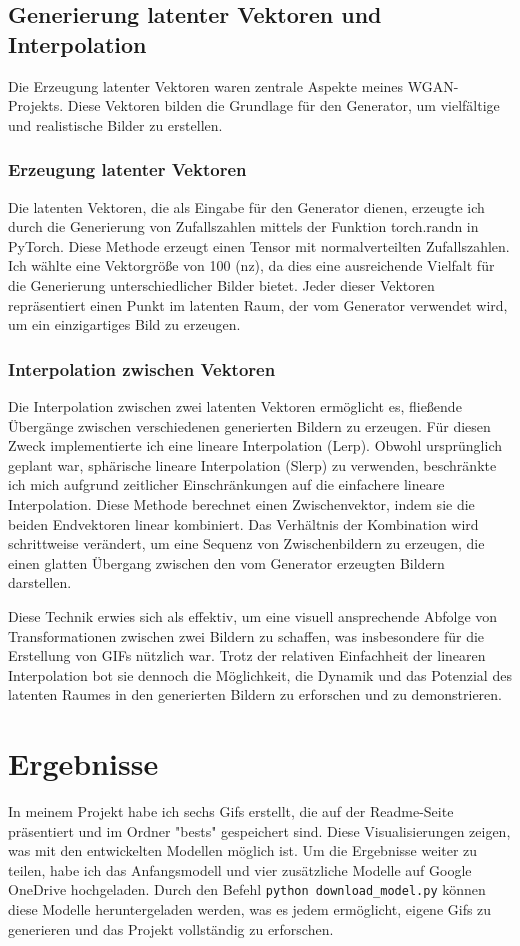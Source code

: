 \documentclass[a4paper, 12pt]{article}
\begin{document}
\subsection{Generierung latenter Vektoren und Interpolation}
Die Erzeugung latenter Vektoren waren zentrale Aspekte meines WGAN-Projekts. Diese Vektoren bilden die Grundlage für den Generator, um vielfältige und realistische Bilder zu erstellen.

\subsubsection{Erzeugung latenter Vektoren}
Die latenten Vektoren, die als Eingabe für den Generator dienen, erzeugte ich durch die Generierung von Zufallszahlen mittels der Funktion torch.randn in PyTorch. Diese Methode erzeugt einen Tensor mit normalverteilten Zufallszahlen. Ich wählte eine Vektorgröße von 100 (nz), da dies eine ausreichende Vielfalt für die Generierung unterschiedlicher Bilder bietet. Jeder dieser Vektoren repräsentiert einen Punkt im latenten Raum, der vom Generator verwendet wird, um ein einzigartiges Bild zu erzeugen.

\subsubsection{Interpolation zwischen Vektoren}
Die Interpolation zwischen zwei latenten Vektoren ermöglicht es, fließende Übergänge zwischen verschiedenen generierten Bildern zu erzeugen. Für diesen Zweck implementierte ich eine lineare Interpolation (Lerp). Obwohl ursprünglich geplant war, sphärische lineare Interpolation (Slerp) zu verwenden, beschränkte ich mich aufgrund zeitlicher Einschränkungen auf die einfachere lineare Interpolation. Diese Methode berechnet einen Zwischenvektor, indem sie die beiden Endvektoren linear kombiniert. Das Verhältnis der Kombination wird schrittweise verändert, um eine Sequenz von Zwischenbildern zu erzeugen, die einen glatten Übergang zwischen den vom Generator erzeugten Bildern darstellen.

Diese Technik erwies sich als effektiv, um eine visuell ansprechende Abfolge von Transformationen zwischen zwei Bildern zu schaffen, was insbesondere für die Erstellung von GIFs nützlich war. Trotz der relativen Einfachheit der linearen Interpolation bot sie dennoch die Möglichkeit, die Dynamik und das Potenzial des latenten Raumes in den generierten Bildern zu erforschen und zu demonstrieren.


\section{Ergebnisse}
In meinem Projekt habe ich sechs Gifs erstellt, die auf der Readme-Seite präsentiert und im Ordner "bests" gespeichert sind. Diese Visualisierungen zeigen, was mit den entwickelten Modellen möglich ist. Um die Ergebnisse weiter zu teilen, habe ich das Anfangsmodell und vier zusätzliche Modelle auf Google OneDrive hochgeladen. Durch den Befehl \texttt{python download\_model.py} können diese Modelle heruntergeladen werden, was es jedem ermöglicht, eigene Gifs zu generieren und das Projekt vollständig zu erforschen.
\end{document}

